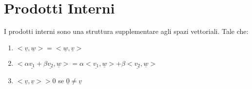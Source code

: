 \section{Prodotti Interni} %
I prodotti interni sono una struttura supplementare agli spazi vettoriali.
Tale che:
\begin{enumerate}
	\item $<\underline{v},\underline{w}> = <\underline{w},\underline{v}>$
	\item $<\alpha \underline{v_1} + \beta \underline{v_2},\underline{w}> =\alpha <\underline{v_1},\underline{w}> + \beta <\underline{v_2},\underline{w}> $
	\item $<\underline{v},\underline{v}> > 0$ se $\underline{0}\neq \underline{v}$
\end{enumerate}